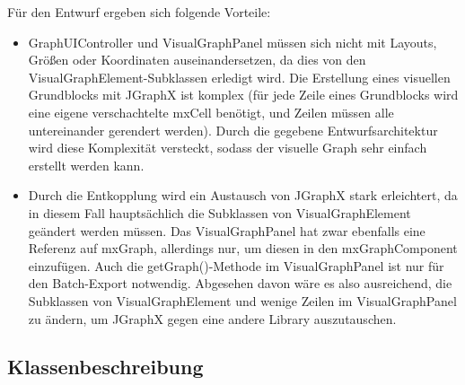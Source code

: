 Für den Entwurf ergeben sich folgende Vorteile:
\begin{itemize}
	\item GraphUIController und VisualGraphPanel müssen sich nicht mit Layouts, Größen oder Koordinaten auseinandersetzen, da dies von den VisualGraphElement-Subklassen erledigt wird.
	    Die Erstellung eines visuellen Grundblocks mit JGraphX ist komplex (für jede Zeile eines Grundblocks wird eine eigene verschachtelte mxCell benötigt, und Zeilen müssen alle untereinander gerendert werden).
	    Durch die gegebene Entwurfsarchitektur wird diese Komplexität versteckt, sodass der visuelle Graph sehr einfach erstellt werden kann.
	\item Durch die Entkopplung wird ein Austausch von JGraphX stark erleichtert, da in diesem Fall hauptsächlich die Subklassen von VisualGraphElement geändert werden müssen.
        Das VisualGraphPanel hat zwar ebenfalls eine Referenz auf mxGraph, allerdings nur, um diesen in den mxGraphComponent einzufügen. 
        Auch die getGraph()-Methode im VisualGraphPanel ist nur für den Batch-Export notwendig.
        Abgesehen davon wäre es also ausreichend, die Subklassen von VisualGraphElement und wenige Zeilen im VisualGraphPanel zu ändern, um JGraphX gegen eine andere Library auszutauschen.
        
\end{itemize}



\subsection{Klassenbeschreibung}
